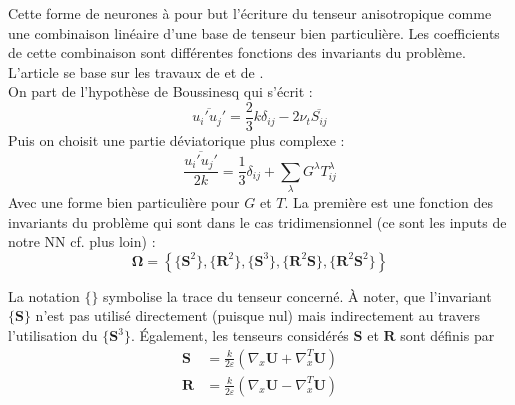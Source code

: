 \documentclass[a4paper,12pt]{report}
\numberwithin{equation}{section} %
\begin{document}
\noindent Cette forme de neurones à pour but l'écriture du tenseur anisotropique comme une combinaison linéaire d'une base de tenseur bien particulière.  Les coefficients de cette combinaison sont différentes fonctions des invariants du problème. L'article se base sur les travaux de \cite{pope1975more} et de \cite{smith1965isotropic}.\\
On part de l'hypothèse de Boussinesq qui s'écrit :
\begin{equation*}
\overline{u_i' u_j'} = \frac{2}{3} k \delta_{ij} - 2 \nu_t \overline{S_{ij}}
\end{equation*}
Puis on choisit une partie déviatorique plus complexe :
\begin{equation*}
\frac{\overline{u_i' u_j'} }{2k}= \frac{1}{3} \delta_{ij} + \sum_\lambda G^\lambda T^\lambda_{ij} 
\end{equation*}
Avec une forme bien particulière pour $G$ et $T$. La première est une fonction des invariants du problème qui sont dans le cas tridimensionnel (ce sont les inputs de notre NN cf. plus loin) : 
\begin{equation*}
\mathbf{\Omega}= \left \{ \{\textbf{S}^2\}, \{\textbf{R}^2\}, \{\textbf{S}^3\}, \{\textbf{R}^2\textbf{S}\}, \{\textbf{R}^2 \textbf{S}^2\}\right \} 
\end{equation*}

\noindent La notation $\textbf{\{\}}$ symbolise la trace du tenseur concerné. À noter, que l'invariant $\{\textbf{S}\}$ n'est pas utilisé directement (puisque nul) mais indirectement au travers l'utilisation du $\{\textbf{S}^3\}$. Également, les tenseurs considérés $\textbf{S}$ et $\textbf{R}$ sont définis par 
\begin{align*}
\textbf{S} &= \frac{k}{2\varepsilon}\left(\nabla_x\textbf{U} + \nabla^T_x\textbf{U} \right) \\[0.2cm]
\textbf{R} &= \frac{k}{2 \varepsilon}\left(\nabla_x\textbf{U} - \nabla^T_x\textbf{U} \right) 
\end{align*} 

\pagebreak 
\end{document}
